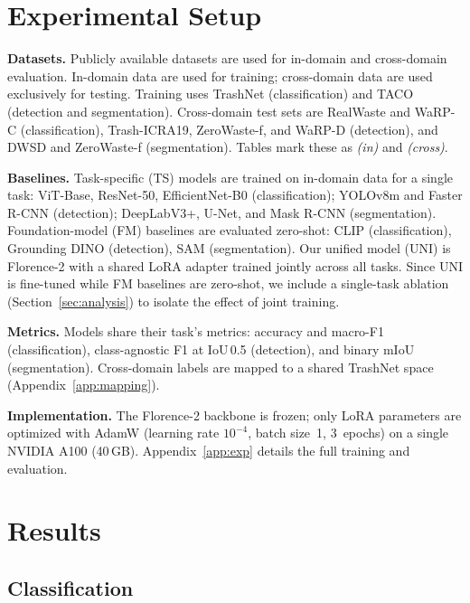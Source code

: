 \documentclass[conference]{IEEEtran}
\begin{document}
\section{Experimental Setup}
\textbf{Datasets.} Publicly available datasets are used for in-domain and
cross-domain evaluation. In-domain data are used for training; cross-domain data
are used exclusively for testing. Training uses TrashNet (classification) and TACO (detection and
segmentation). Cross-domain test sets are RealWaste and WaRP-C (classification),
Trash-ICRA19, ZeroWaste-f, and WaRP-D (detection), and DWSD and ZeroWaste-f
(segmentation). Tables mark these as \emph{(in)} and \emph{(cross)}.

\textbf{Baselines.} Task-specific (TS) models are trained on in-domain data for a
single task: ViT-Base, ResNet-50, EfficientNet-B0 (classification); YOLOv8m and
Faster R-CNN (detection); DeepLabV3+, U-Net, and Mask R-CNN (segmentation).
Foundation-model (FM) baselines are evaluated zero-shot: CLIP (classification),
Grounding DINO (detection), SAM (segmentation). Our unified model (UNI) is
Florence-2 with a shared LoRA adapter trained jointly across all tasks. Since UNI
is fine-tuned while FM baselines are zero-shot, we include a single-task ablation
(Section~\ref{sec:analysis}) to isolate the effect of joint training.

\textbf{Metrics.} Models share their task's metrics: accuracy and macro-F1
(classification), class-agnostic F1 at IoU\,0.5 (detection), and binary mIoU
(segmentation). Cross-domain labels are mapped to a shared TrashNet space
(Appendix~\ref{app:mapping}).

\textbf{Implementation.} The Florence-2 backbone is frozen; only LoRA parameters
are optimized with AdamW (learning rate $10^{-4}$, batch size~1, 3~epochs) on a
single NVIDIA A100 (40\,GB). Appendix~\ref{app:exp} details the full training and
evaluation.

\section{Results}

\subsection{Classification}
\end{document}
